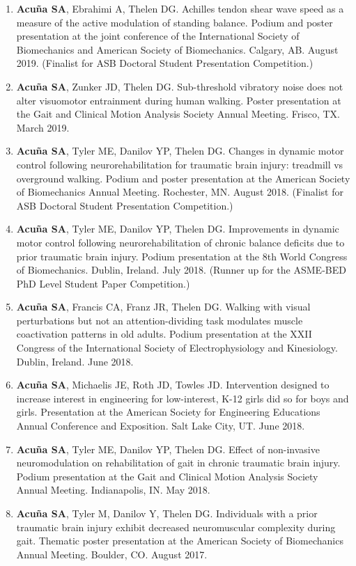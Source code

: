 \documentclass[letterpaper, 10pt]{article}
\begin{document}
\begin{enumerate}
    \item \textbf{Acuña SA}, Ebrahimi A, Thelen DG. Achilles tendon shear wave speed as a measure of the active modulation of standing balance. Podium and poster presentation at the joint conference of the International Society of Biomechanics and American Society of Biomechanics. Calgary, AB. August 2019. (Finalist for ASB Doctoral Student Presentation Competition.)
    \item \textbf{Acuña SA}, Zunker JD, Thelen DG. Sub-threshold vibratory noise does not alter visuomotor entrainment during human walking. Poster presentation at the Gait and Clinical Motion Analysis Society Annual Meeting. Frisco, TX. March 2019.
    \item \textbf{Acuña SA}, Tyler ME, Danilov YP, Thelen DG. Changes in dynamic motor control following neurorehabilitation for traumatic brain injury: treadmill vs overground walking. Podium and poster presentation at the American Society of Biomechanics Annual Meeting. Rochester, MN. August 2018. (Finalist for ASB Doctoral Student Presentation Competition.)
    \item \textbf{Acuña SA}, Tyler ME, Danilov YP, Thelen DG. Improvements in dynamic motor control following neurorehabilitation of chronic balance deﬁcits due to prior traumatic brain injury. Podium presentation at the 8th World Congress of Biomechanics. Dublin, Ireland. July 2018. (Runner up for the ASME-BED PhD Level Student Paper Competition.)
    \item \textbf{Acuña SA}, Francis CA, Franz JR, Thelen DG. Walking with visual perturbations but not an attention-dividing task modulates muscle coactivation patterns in old adults. Podium presentation at the XXII Congress of the International Society of Electrophysiology and Kinesiology. Dublin, Ireland. June 2018.
    \item \textbf{Acuña SA}, Michaelis JE, Roth JD, Towles JD. Intervention designed to increase interest in engineering for low-interest, K-12 girls did so for boys and girls. Presentation at the American Society for Engineering Educations Annual Conference and Exposition. Salt Lake City, UT. June 2018.
    \item \textbf{Acuña SA}, Tyler ME, Danilov YP, Thelen DG. Effect of non-invasive neuromodulation on rehabilitation of gait in chronic traumatic brain injury. Podium presentation at the Gait and Clinical Motion Analysis Society Annual Meeting. Indianapolis, IN. May 2018.
    \item \textbf{Acuña SA}, Tyler M, Danilov Y, Thelen DG. Individuals with a prior traumatic brain injury exhibit decreased neuromuscular complexity during gait. Thematic poster presentation at the American Society of Biomechanics Annual Meeting. Boulder, CO. August 2017.

\end{enumerate}
\end{document}
